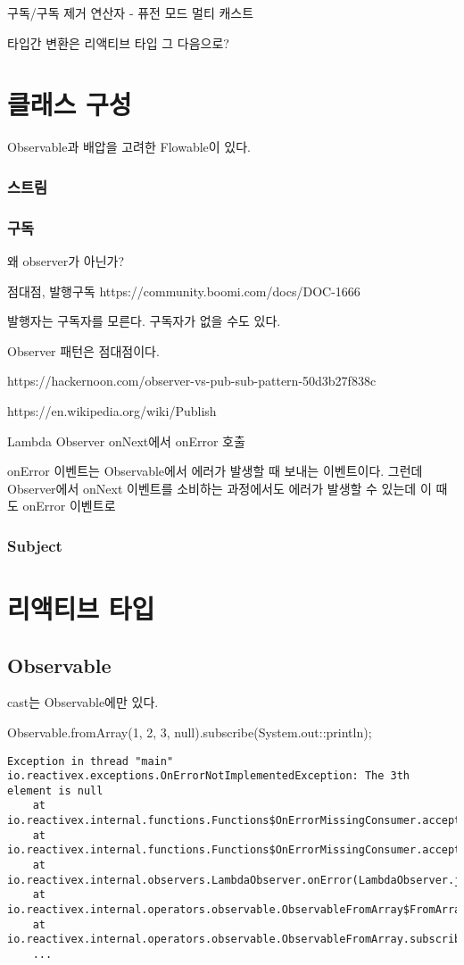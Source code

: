 \documentclass{book}
\begin{document}
구독/구독 제거
연산자
- 퓨전 모드
멀티 캐스트

타입간 변환은 리액티브 타입 그 다음으로?

\section{클래스 구성}
Observable과 배압을 고려한 Flowable이 있다.

\subsubsection{스트림}

\subsubsection{구독}
왜 observer가 아닌가?

점대점, 발행구독
https://community.boomi.com/docs/DOC-1666

발행자는 구독자를 모른다. 구독자가 없을 수도 있다.

Observer 패턴은 점대점이다. 

https://hackernoon.com/observer-vs-pub-sub-pattern-50d3b27f838c

https://en.wikipedia.org/wiki/Publish%

Lambda Observer onNext에서 onError 호출

onError 이벤트는 Observable에서 에러가 발생할 때 보내는 이벤트이다. 그런데 Observer에서 onNext 이벤트를 소비하는 과정에서도 에러가 발생할 수 있는데 이 때도 onError 이벤트로 


\subsubsection{Subject}

\section{리액티브 타입}
\subsection{Observable}
cast는 Observable에만 있다.


Observable.fromArray(1, 2, 3, null).subscribe(System.out::println);
\begin{verbatim}
Exception in thread "main" io.reactivex.exceptions.OnErrorNotImplementedException: The 3th element is null
	at io.reactivex.internal.functions.Functions$OnErrorMissingConsumer.accept(Functions.java:704)
	at io.reactivex.internal.functions.Functions$OnErrorMissingConsumer.accept(Functions.java:701)
	at io.reactivex.internal.observers.LambdaObserver.onError(LambdaObserver.java:74)
	at io.reactivex.internal.operators.observable.ObservableFromArray$FromArrayDisposable.run(ObservableFromArray.java:104)
	at io.reactivex.internal.operators.observable.ObservableFromArray.subscribeActual(ObservableFromArray.java:36)
	...
\end{verbatim}
\end{document}
